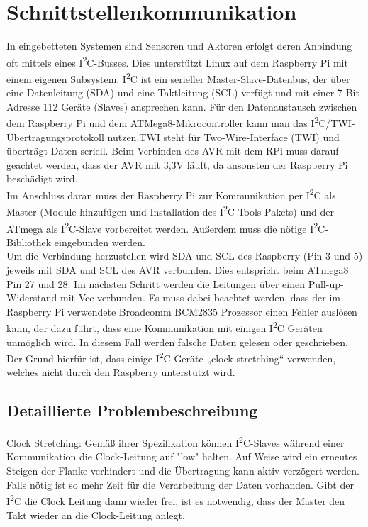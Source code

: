 
\chapter{Schnittstellenkommunikation}
In eingebetteten Systemen sind Sensoren und Aktoren erfolgt deren Anbindung oft mittels eines I\textsuperscript{2}C-Busses. Dies unterstützt Linux auf dem Raspberry Pi mit einem eigenen Subsystem. I\textsuperscript{2}C ist ein serieller Master-Slave-Datenbus, der über eine Datenleitung (SDA) und eine Taktleitung (SCL) verfügt und mit einer 7-Bit-Adresse 112 Geräte (Slaves) ansprechen kann. Für den Datenaustausch zwischen dem Raspberry Pi und dem ATMega8-Mikrocontroller kann man das I\textsuperscript{2}C/TWI-Übertragungsprotokoll nutzen.TWI steht für Two-Wire-Interface (TWI) und überträgt Daten seriell.
Beim Verbinden des AVR mit dem RPi muss darauf geachtet werden, dass der AVR mit 3,3V läuft, da ansonsten der Raspberry Pi beschädigt wird.\\
Im Anschluss daran muss der Raspberry Pi zur Kommunikation per I\textsuperscript{2}C als Master (Module hinzufügen und Installation des I\textsuperscript{2}C-Tools-Pakets) und der ATmega als I\textsuperscript{2}C-Slave vorbereitet werden. Außerdem muss die nötige I\textsuperscript{2}C-Bibliothek eingebunden werden.\\
Um die Verbindung herzustellen wird SDA und SCL des Raspberry (Pin 3 und 5) jeweils mit SDA und SCL des AVR verbunden. Dies entspricht beim ATmega8 Pin 27 und 28. Im nächsten Schritt werden die Leitungen über einen Pull-up-Widerstand mit Vcc verbunden.
Es muss dabei beachtet werden, dass der im Raspberry Pi verwendete Broadcomm BCM2835 Prozessor einen Fehler auslösen kann, der dazu führt, dass eine Kommunikation mit einigen I\textsuperscript{2}C Geräten unmöglich wird. In diesem Fall werden falsche Daten gelesen oder geschrieben. Der Grund hierfür ist, dass einige I\textsuperscript{2}C Geräte „clock stretching“ verwenden, welches nicht durch den Raspberry unterstützt wird. 

\section{Detaillierte Problembeschreibung}
Clock Stretching: Gemäß ihrer Spezifikation können I\textsuperscript{2}C-Slaves während einer Kommunikation die Clock-Leitung auf "low" halten. Auf Weise wird ein erneutes Steigen der Flanke verhindert und die Übertragung kann aktiv verzögert werden. Falls nötig ist so mehr Zeit für die Verarbeitung der Daten vorhanden. Gibt der I\textsuperscript{2}C die Clock Leitung dann wieder frei, ist es notwendig, dass der Master den Takt wieder an die Clock-Leitung anlegt.

